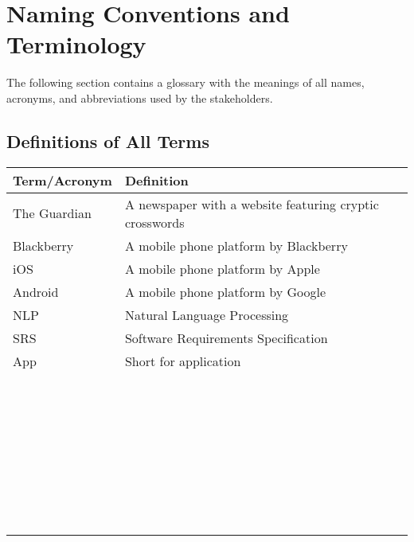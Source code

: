 \section{Naming Conventions and Terminology}

The following section contains a glossary with the meanings of all names, acronyms, and abbreviations used by the stakeholders.

\newpage
\subsection{Definitions of All Terms}

\begin{table}
    \begin{tabular}{|l|l|}
    \hline
    Term/Acronym  & Definition                                                \\ \hline
    The Guardian  &  A newspaper with a website featuring cryptic  crosswords \\ \hline
    Blackberry    & A mobile phone platform by Blackberry                     \\ \hline
    iOS           & A mobile phone platform by Apple                          \\ \hline
    Android       & A mobile phone platform by  Google                        \\ \hline
    NLP           & Natural Language Processing                               \\ \hline
    SRS           & Software Requirements Specification                       \\ \hline
    App           & Short for application                                     \\ \hline
    ~             & ~                                                         \\ \hline
    ~             & ~                                                         \\ \hline
    ~             & ~                                                         \\ \hline
    ~             & ~                                                         \\ \hline
    ~             & ~                                                         \\ \hline
    ~             & ~                                                         \\ \hline
    ~             & ~                                                         \\ \hline
    \end{tabular}
\end{table}

